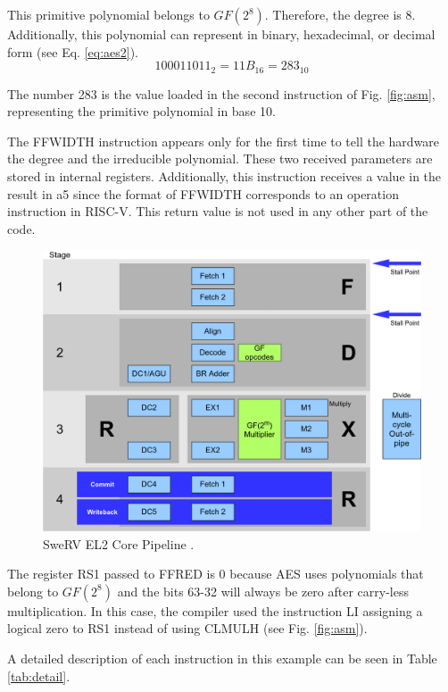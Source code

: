 This primitive polynomial belongs to $GF(2^8)$. Therefore, the degree is 8. Additionally, this polynomial can represent in binary, 
hexadecimal, or decimal form (see Eq. \ref{eq:aes2}). 
\begin{equation}
    100011011_{2}=11B_{16}=283_{10}
    \label{eq:aes2}
\end{equation}


The number 283 is the value loaded in the second instruction of Fig. \ref{fig:asm}, representing the primitive polynomial in base 10.

The FFWIDTH instruction appears only for the first time to tell the hardware 
the degree and the irreducible polynomial. These two received parameters are stored in internal registers. 
Additionally, this instruction receives a value in the result in a5 since the format of FFWIDTH corresponds to an 
operation instruction in RISC-V. This return value is not used in any other part of the code.


\begin{figure}[b]
    \centering
    \includegraphics[width=0.95\linewidth]{img/swerv.png}
    \caption{SweRV EL2 Core Pipeline \cite{swervel2}.}
    \label{fig:swerv}
\end{figure}

The register RS1 passed to FFRED is 0 because AES uses polynomials that belong to $GF(2^8)$ 
and the bits 63-32 will always be zero after carry-less multiplication. In this case, the compiler used the instruction 
LI assigning a logical zero to RS1 instead of using CLMULH (see Fig. \ref{fig:asm}). 

A detailed description of each instruction in this example can be seen in Table \ref{tab:detail}.



